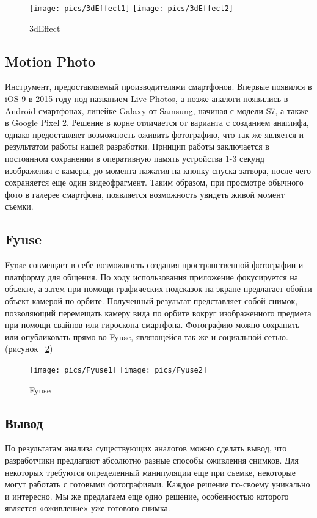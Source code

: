 \begin{figure}[H]
	\centering
	\texttt{[image: pics/3dEffect1]}
	\texttt{[image: pics/3dEffect2]}
	\caption{3dEffect}
	\label{fig:3dEffect}
\end{figure}

\subsection{Motion Photo}

Инструмент, предоставляемый производителями смартфонов. Впервые появился в iOS 9 в 2015 году под названием Live Photos, а позже аналоги появились в Android-смартфонах, линейке Galaxy от Samsung, начиная с модели S7, а также в Google Pixel 2. Решение в корне отличается от варианта с созданием анаглифа, однако предоставляет возможность оживить фотографию, что так же является и результатом работы нашей разработки. Принцип работы заключается в постоянном сохранении в оперативную память устройства 1-3 секунд изображения с камеры, до момента нажатия на кнопку спуска затвора, после чего сохраняется еще один видеофрагмент. Таким образом, при просмотре обычного фото в галерее смартфона, появляется возможность увидеть живой момент съемки.

\subsection{Fyuse}

Fyuse совмещает в себе возможность создания пространственной фотографии и платформу для общения. По ходу использования приложение фокусируется на объекте, а затем при помощи графических подсказок на экране предлагает обойти объект камерой по орбите. Полученный результат представляет собой снимок, позволяющий перемещать камеру вида по орбите вокруг изображенного предмета при помощи свайпов или гироскопа смартфона. Фотографию можно сохранить или опубликовать прямо во Fyuse, являющейся так же и социальной сетью. (рисунок ~\ref{fig:Fyuse})

\begin{figure}[H]
	\centering
	\texttt{[image: pics/Fyuse1]}
	\texttt{[image: pics/Fyuse2]}
	\caption{Fyuse}
	\label{fig:Fyuse}
\end{figure}

\subsection{Вывод}
По результатам анализа существующих аналогов можно сделать вывод, что разработчики предлагают абсолютно разные способы оживления снимков. Для некоторых требуются определенный манипуляции еще при съемке, некоторые могут работать с готовыми фотографиями. Каждое решение по-своему уникально и интересно. Мы же предлагаем еще одно решение, особенностью которого является «оживление» уже готового снимка.